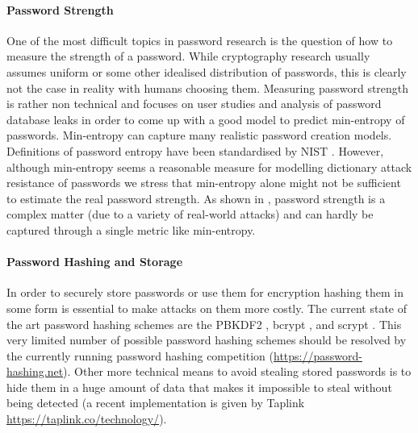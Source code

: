 \paragraph{Password Strength}
One of the most difficult topics in password research is the question of how to measure the strength of a password.
While cryptography research usually assumes uniform or some other idealised distribution of passwords, this is clearly not the case in reality with humans choosing them.
Measuring password strength is rather non technical and focuses on user studies and analysis of password database leaks \cite{ShayKKLMBCC10,KomanduriSKMBCCE11,MazurekKVBCCKSU13} in order to come up with a good model to predict min-entropy of passwords.
Min-entropy can capture many realistic password creation models.
Definitions of password entropy have been standardised by NIST \cite{nist800}.
However, although min-entropy seems a reasonable measure for modelling dictionary attack resistance of passwords we stress that min-entropy alone might not be sufficient to estimate the real password strength. 
As shown in \cite{MazurekKVBCCKSU13}, password strength is a complex matter (due to a variety of real-world attacks) and can hardly be captured through a single metric like min-entropy.

\paragraph{Password Hashing and Storage}
In order to securely store passwords or use them for encryption hashing them in some form is essential to make attacks on them more costly.
The current state of the art password hashing schemes are the \ac{PBKDF2} \cite{rfc2898}, bcrypt \cite{ProvosM99}, and scrypt \cite{rfcScrypt}.
This very limited number of possible password hashing schemes should be resolved by the currently running password hashing competition (\url{https://password-hashing.net}).
Other more technical means to avoid stealing stored passwords is to hide them in a huge amount of data that makes it impossible to steal without being detected (a recent implementation is given by Taplink \url{https://taplink.co/technology/}).

